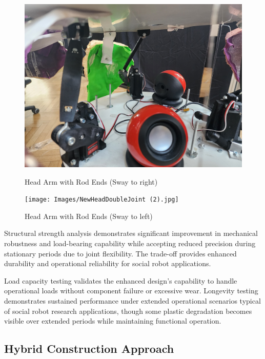 \begin{figure}[H]
    \centering
    \begin{minipage}{0.45\textwidth}
        \centering
        \includegraphics[width=\textwidth]{Images/NewHeadDoubleJoint (6).jpg}
        \caption{Head Arm with Rod Ends (Sway to right)}
        \label{fig:head_arm_rod_end_right}
    \end{minipage}
    \hfill
    \begin{minipage}{0.45\textwidth}
        \centering
        \texttt{[image: Images/NewHeadDoubleJoint (2).jpg]}
        \caption{Head Arm with Rod Ends (Sway to left)}
        \label{fig:head_arm_rod_end_left}
    \end{minipage}
\end{figure}

Structural strength analysis demonstrates significant improvement in mechanical robustness and load-bearing capability while accepting reduced precision during stationary periods due to joint flexibility. The trade-off provides enhanced durability and operational reliability for social robot applications.

Load capacity testing validates the enhanced design's capability to handle operational loads without component failure or excessive wear. Longevity testing demonstrates sustained performance under extended operational scenarios typical of social robot research applications, though some plastic degradation becomes visible over extended periods while maintaining functional operation.

\subsection{Hybrid Construction Approach}

